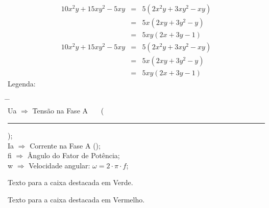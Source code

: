 %
%
\begin{eqnarray}
   \label{eq:Apelido-da-Equacao-1}
   10x^2y+15xy^2-5xy & = & 5(2x^2y+3xy^2-xy) \\    
   \label{eq:Apelido-da-Equacao-2}
                     & = & 5x(2xy+3y^2-y) \\
   \label{eq:Apelido-da-Equacao-3}
                     & = & 5xy(2x+3y-1)    
\end{eqnarray}
%
%
\begin{eqnarray}
   10x^2y+15xy^2-5xy   & = & 5(2x^2y+3xy^2-xy) \nonumber \\
                       & = & 5x(2xy+3y^2-y)    \nonumber \\
   \label{eq:Apelido-da-Equacao}
                       & = & 5xy(2x+3y-1)
\end{eqnarray}
%
%
Legenda:\\
\vspace{-1.3cm}
\begin{tabbing}
    \hspace{1cm}  \= \hspace{1cm} \= \kill \\
    \gls{Ua}      \> $\Rightarrow$ \> Tensão na Fase A ~~~(\textcolor{blue}{\rule{3cm}{1mm}}); \\
    \gls{Ia}      \> $\Rightarrow$ \> Corrente na Fase A (\textcolor{red}{\hdashrule[0.1ex]{3.1cm}{1mm}{2mm}}); \\
    \gls{fi}    \> $\Rightarrow$ \> Ângulo do Fator de Potência; \\
    \gls{w}    \> $\Rightarrow$ \> Velocidade angular: $\omega=2\cdot \pi \cdot f$;    
\end{tabbing}
%
%
\begin{CaixaVerde}
    Texto para a caixa destacada em Verde.
\end{CaixaVerde}
%
\begin{CaixaVermelha}
    Texto para a caixa destacada em Vermelho.
\end{CaixaVermelha}
%
% 

